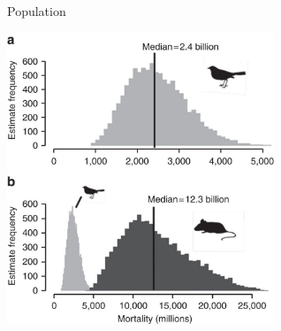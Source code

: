 \documentclass[12pt]{beamer}
\begin{document}
\begin{frame}

	\begin{flushright}
	  \Large \textcolor{boss2}{Population} 
	\end{flushright}

  \begin{center}
    \includegraphics[width=0.6\textwidth]{figs/population.jpg}
  \end{center}
  \let\thefootnote\relax{}

\end{frame}
\end{document}
